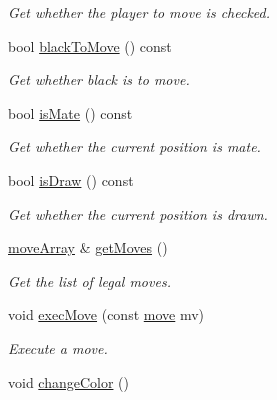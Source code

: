 \begin{DoxyCompactItemize}
\begin{DoxyCompactList}\small\item\em Get whether the player to move is checked. \end{DoxyCompactList}\item 
bool \hyperlink{classBoard_acfa3dcd69de0f9e553a971f6dd83f69b}{black\+To\+Move} () const \hypertarget{classBoard_acfa3dcd69de0f9e553a971f6dd83f69b}{}\label{classBoard_acfa3dcd69de0f9e553a971f6dd83f69b}

\begin{DoxyCompactList}\small\item\em Get whether black is to move. \end{DoxyCompactList}\item 
bool \hyperlink{classBoard_ad7df4c9d18b4c42d133a21aea6b8485f}{is\+Mate} () const \hypertarget{classBoard_ad7df4c9d18b4c42d133a21aea6b8485f}{}\label{classBoard_ad7df4c9d18b4c42d133a21aea6b8485f}

\begin{DoxyCompactList}\small\item\em Get whether the current position is mate. \end{DoxyCompactList}\item 
bool \hyperlink{classBoard_a5103bd00afbe361f7aa14c098ee43b57}{is\+Draw} () const \hypertarget{classBoard_a5103bd00afbe361f7aa14c098ee43b57}{}\label{classBoard_a5103bd00afbe361f7aa14c098ee43b57}

\begin{DoxyCompactList}\small\item\em Get whether the current position is drawn. \end{DoxyCompactList}\item 
\hyperlink{structmoveArray}{move\+Array} \& \hyperlink{classBoard_a993b2839790b3fbe4b1c6ba2a2257fe1}{get\+Moves} ()\hypertarget{classBoard_a993b2839790b3fbe4b1c6ba2a2257fe1}{}\label{classBoard_a993b2839790b3fbe4b1c6ba2a2257fe1}

\begin{DoxyCompactList}\small\item\em Get the list of legal moves. \end{DoxyCompactList}\item 
void \hyperlink{classBoard_a5732564ae8ce7f247072ded83f71dc75}{exec\+Move} (const \hyperlink{structmove}{move} mv)
\begin{DoxyCompactList}\small\item\em Execute a move. \end{DoxyCompactList}\item 
void \hyperlink{classBoard_ac33aaf879882d2c1abbab14c9727f2f9}{change\+Color} ()\hypertarget{classBoard_ac33aaf879882d2c1abbab14c9727f2f9}{}\label{classBoard_ac33aaf879882d2c1abbab14c9727f2f9}


\end{DoxyCompactItemize}
